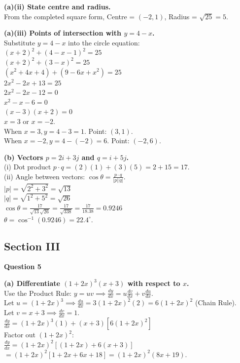 \documentclass[12pt]{article}
\begin{document}
\textbf{(a)(ii) State centre and radius.} \\
From the completed square form, Centre = $(-2, 1)$, Radius = $\sqrt{25} = 5$.

\textbf{(a)(iii) Points of intersection with $y = 4 - x$.} \\
Substitute $y = 4 - x$ into the circle equation: \\
$(x + 2)^2 + (4 - x - 1)^2 = 25$ \\
$(x + 2)^2 + (3 - x)^2 = 25$ \\
$(x^2 + 4x + 4) + (9 - 6x + x^2) = 25$ \\
$2x^2 - 2x + 13 = 25$ \\
$2x^2 - 2x - 12 = 0$ \\
$x^2 - x - 6 = 0$ \\
$(x - 3)(x + 2) = 0$ \\
$x = 3$ or $x = -2$. \\
When $x = 3, y = 4 - 3 = 1$. Point: $(3, 1)$. \\
When $x = -2, y = 4 - (-2) = 6$. Point: $(-2, 6)$.

\textbf{(b) Vectors $p = 2i + 3j$ and $q = i + 5j$.} \\
(i) Dot product $p \cdot q = (2)(1) + (3)(5) = 2 + 15 = 17$. \\
(ii) Angle between vectors: $\cos \theta = \frac{p \cdot q}{|p||q|}$. \\
$|p| = \sqrt{2^2 + 3^2} = \sqrt{13}$ \\
$|q| = \sqrt{1^2 + 5^2} = \sqrt{26}$ \\
$\cos \theta = \frac{17}{\sqrt{13}\sqrt{26}} = \frac{17}{\sqrt{338}} = \frac{17}{18.38} = 0.9246$ \\
$\theta = \cos^{-1}(0.9246) = 22.4^{\circ}$.

\subsection*{Section III}

\textbf{Question 5}

\textbf{(a) Differentiate $(1+2x)^3(x+3)$ with respect to $x$.} \\
Use the Product Rule: $y = uv \implies \frac{dy}{dx} = u\frac{dv}{dx} + v\frac{du}{dx}$. \\
Let $u = (1+2x)^3 \implies \frac{du}{dx} = 3(1+2x)^2(2) = 6(1+2x)^2$ (Chain Rule). \\
Let $v = x+3 \implies \frac{dv}{dx} = 1$. \\
$\frac{dy}{dx} = (1+2x)^3(1) + (x+3)[6(1+2x)^2]$ \\
Factor out $(1+2x)^2$: \\
$\frac{dy}{dx} = (1+2x)^2 [ (1+2x) + 6(x+3) ]$ \\
$= (1+2x)^2 [ 1 + 2x + 6x + 18 ] = (1+2x)^2(8x + 19)$.
\end{document}
